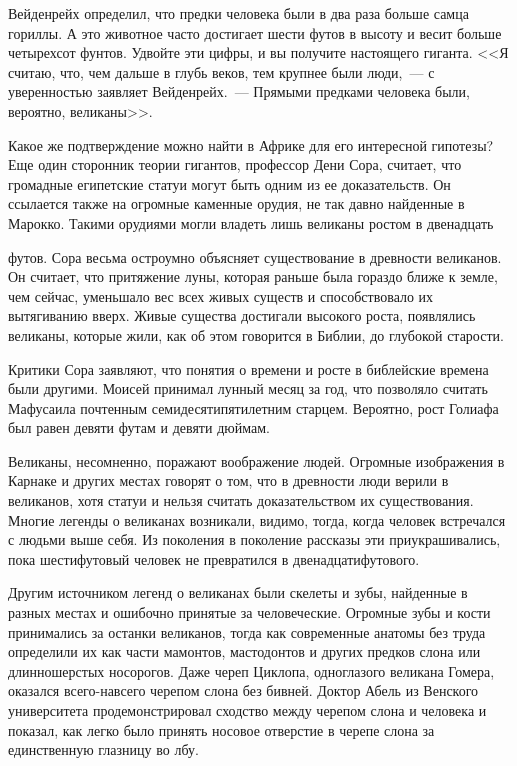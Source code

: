 \documentclass[12pt,a4paper,twoside,openany,svgnames]{memoir}
\begin{document}
Вейденрейх определил, что предки человека были в два раза больше самца гориллы. А это животное часто достигает шести футов в высоту и весит больше четырехсот фунтов. Удвойте эти цифры, и вы получите настоящего гиганта. <<Я считаю, что, чем дальше в глубь веков, тем крупнее были люди,~--- с уверенностью заявляет Вейденрейх.~--- Прямыми предками человека были, вероятно, великаны>>.

Какое же подтверждение можно найти в Африке для его интересной гипотезы? Еще один сторонник теории гигантов, профессор Дени Сора, считает, что громадные египетские статуи могут быть одним из ее доказательств. Он ссылается также на огромные каменные орудия, не так давно найденные в Марокко. Такими орудиями могли владеть лишь великаны ростом в двенадцать

футов. Сора весьма остроумно объясняет существование в древности великанов. Он считает, что притяжение луны, которая раньше была гораздо ближе к земле, чем сейчас, уменьшало вес всех живых существ и способствовало их вытягиванию вверх. Живые существа достигали высокого роста, появлялись великаны, которые жили, как об этом говорится в Библии, до глубокой старости.

Критики Сора заявляют, что понятия о времени и росте в библейские времена были другими. Моисей принимал лунный месяц за год, что позволяло считать Мафусаила почтенным семидесятипятилетним старцем. Вероятно, рост Голиафа был равен девяти футам и девяти дюймам.

Великаны, несомненно, поражают воображение людей. Огромные изображения в Карнаке и других местах говорят о том, что в древности люди верили в великанов, хотя статуи и нельзя считать доказательством их существования. Многие легенды о великанах возникали, видимо, тогда, когда человек встречался с людьми выше себя. Из поколения в поколение рассказы эти приукрашивались, пока шестифутовый человек не превратился в двенадцатифутового.

Другим источником легенд о великанах были скелеты и зубы, найденные в разных местах и ошибочно принятые за человеческие. Огромные зубы и кости принимались за останки великанов, тогда как современные анатомы без труда определили их как части мамонтов, мастодонтов и других предков слона или длинношерстых носорогов. Даже череп Циклопа, одноглазого великана Гомера, оказался всего-навсего черепом слона без бивней. Доктор Абель из Венского университета продемонстрировал сходство между черепом слона и человека и показал, как легко было принять носовое отверстие в черепе слона за единственную глазницу во лбу.
\end{document}
